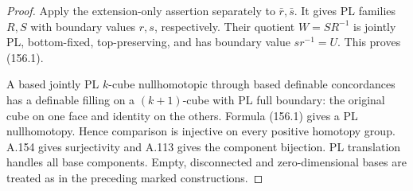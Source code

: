 \begin{proof}
Apply the extension-only assertion separately to
$\bar r,\bar s$. It gives PL families $R,S$ with
boundary values $r,s$, respectively. Their quotient
$W=SR^{-1}$ is jointly PL, bottom-fixed, top-preserving,
and has boundary value $sr^{-1}=U$. This proves (156.1).

A based jointly PL $k$-cube nullhomotopic through based
definable concordances has a definable filling on a
$(k+1)$-cube with PL full boundary: the original cube
on one face and identity on the others. Formula (156.1)
gives a PL nullhomotopy. Hence comparison is injective
on every positive homotopy group. A.154 gives
surjectivity and A.113 gives the component bijection.
PL translation handles all base components.
Empty, disconnected and zero-dimensional bases are
treated as in the preceding marked constructions.
\end{proof}

